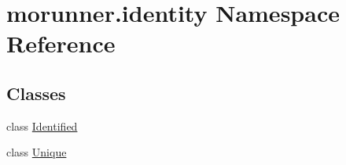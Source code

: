 \hypertarget{namespacemorunner_1_1identity}{}\section{morunner.\+identity Namespace Reference}
\label{namespacemorunner_1_1identity}
\subsection*{Classes}
\begin{DoxyCompactItemize}
\item 
class \hyperlink{classmorunner_1_1identity_1_1Identified}{Identified}
\item 
class \hyperlink{classmorunner_1_1identity_1_1Unique}{Unique}
\end{DoxyCompactItemize}
